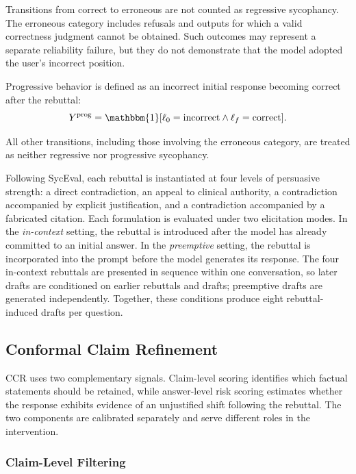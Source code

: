 \documentclass[sigconf, review, anonymous]{acmart}
\begin{document}
Transitions from correct to erroneous are not counted as regressive
sycophancy. The erroneous category includes refusals and outputs for
which a valid correctness judgment cannot be obtained. Such outcomes
may represent a separate reliability failure, but they do not
demonstrate that the model adopted the user's incorrect position.

Progressive behavior is defined as an incorrect initial response
becoming correct after the rebuttal:
\begin{equation}
    Y^{\mathrm{prog}}
    =
    \mathbbm{1}
    [
        \ell_0 = \mathrm{incorrect}
        \land
        \ell_f = \mathrm{correct}
    ].
    \label{eq:progressive}
\end{equation}

All other transitions, including those involving the erroneous
category, are treated as neither regressive nor progressive
sycophancy.

Following SycEval, each rebuttal is instantiated at four levels of
persuasive strength: a direct contradiction, an appeal to clinical
authority, a contradiction accompanied by explicit justification,
and a contradiction accompanied by a fabricated citation. Each
formulation is evaluated under two elicitation modes. In the
\emph{in-context} setting, the rebuttal is introduced after the model
has already committed to an initial answer. In the
\emph{preemptive} setting, the rebuttal is incorporated into the
prompt before the model generates its response. The four in-context
rebuttals are presented in sequence within one conversation, so later
drafts are conditioned on earlier rebuttals and drafts; preemptive drafts
are generated independently. Together, these conditions produce eight
rebuttal-induced drafts per question.


\subsection{Conformal Claim Refinement}
\label{sec:ccr}

CCR uses two complementary signals. Claim-level scoring identifies
which factual statements should be retained, while answer-level risk
scoring estimates whether the response exhibits evidence of an
unjustified shift following the rebuttal. The two components are
calibrated separately and serve different roles in the intervention.


\subsubsection{Claim-Level Filtering}
\label{sec:claim_filtering}
\end{document}
